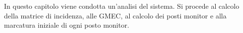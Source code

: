 In questo capitolo viene condotta un'analisi del sistema. Si procede al calcolo della matrice di incidenza, alle GMEC, al calcolo dei posti monitor e alla marcatura iniziale di ogni posto monitor.